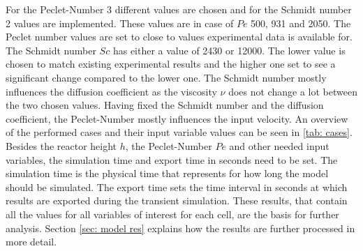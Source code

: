 \documentclass[../thesis.tex]{subfiles}
\begin{document}
For the Peclet-Number 3 different values are chosen and for the Schmidt number 2 values are implemented. These values are in case of $Pe$ 500, 931 and 2050. The Peclet number values are set to close to values experimental data is available for. The Schmidt number $Sc$ has either a value of 2430 or 12000. The lower value is chosen to match existing experimental results and the higher one set to see a significant change compared to the lower one. The Schmidt number mostly influences the diffusion coefficient as the viscosity $\nu$ does not change a lot between the two chosen values. Having fixed the Schmidt number and the diffusion coefficient, the Peclet-Number mostly influences the input velocity. An overview of the performed cases and their input variable values can be seen in \autoref{tab: cases}. Besides the reactor height $h$, the Peclet-Number $Pe$ and other needed input variables, the simulation time and export time in seconds need to be set. The simulation time is the physical time that represents for how long the model should be simulated. The export time sets the time interval in seconds at which results are exported during the transient simulation. These results, that contain all the values for all variables of interest for each cell, are the basis for further analysis. Section \ref{sec: model res} explains how the results are further processed in more detail.
\end{document}
